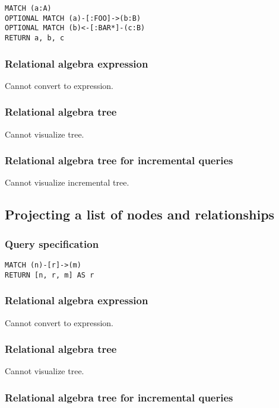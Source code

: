 \begin{lstlisting}
MATCH (a:A)
OPTIONAL MATCH (a)-[:FOO]->(b:B)
OPTIONAL MATCH (b)<-[:BAR*]-(c:B)
RETURN a, b, c
\end{lstlisting}

\subsubsection*{Relational algebra expression}

Cannot convert to expression.

\subsubsection*{Relational algebra tree}

Cannot visualize tree.

\subsubsection*{Relational algebra tree for incremental queries}

Cannot visualize incremental tree.

\subsection{Projecting a list of nodes and relationships}

\subsubsection*{Query specification}

\begin{lstlisting}
MATCH (n)-[r]->(m)
RETURN [n, r, m] AS r
\end{lstlisting}

\subsubsection*{Relational algebra expression}

Cannot convert to expression.

\subsubsection*{Relational algebra tree}

Cannot visualize tree.

\subsubsection*{Relational algebra tree for incremental queries}

